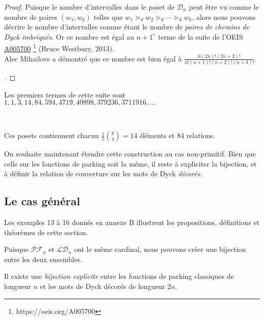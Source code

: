 \begin{proof}
    Puisque le nombre d'intervalles dans le poset de $\mathcal{D}_n$
    peut être vu comme le nombre de paires $(w_1, w_k)$ telles que
    $w_1 \gtrdot_d w_2 \gtrdot_d \cdots \gtrdot_d w_k$, alors nous pouvons
    décrire le nombre d'intervalles comme étant le nombre de 
    \emph{paires de chemins de Dyck imbriqués}.
    Or ce nombre est égal au $n+1^{e}$ terme de la suite de l'OEIS 
    \href{https://oeis.org/A005700}{A005700}
    \footnote{https://oeis.org/A005700} (Bruce Westbury, 2013).\\
Alec Mihailovs a démontré que ce nombre est bien égal à 
$\displaystyle\frac {6 (2n)! (2n+2)!}{n!(n+1)!(n+2)!(n+3)!}$.

.
\end{proof}

Les premiers termes de cette suite sont $1, 1, 3, 14, 84,
594, 4719, 40898, 379236, 3711916, ...$\\

\begin{expl}
    ~\\
    \begin{center}
        
        Ces posets contiennent chacun $\frac {1}{5} \binom{8}{4} =
        14$ éléments et $84$ relations.
    \end{center}
\end{expl}

On souhaite maintenant étendre cette construction au cas non-primitif.
Bien que celle sur les fonctions de parking soit la même, il
reste à expliciter la bijection, et à définir la relation de couverture
sur les mots de Dyck \emph{décorés}.

\subsection{Le cas général}

Les exemples 13 à 16 donnés en annexe B illustrent les propositions,
définitions et théorèmes de cette section.

Puisque $\mathcal{PF}_n$ et $\mathcal{LD}_n$ ont le même cardinal,
nous pouvons créer une bijection entre les deux ensembles.

\begin{prop}
    Il existe une \emph{bijection explicite} entre les fonctions de parking
    classiques de longueur $n$ et les mots de Dyck décorés de
    longueur $2n$.
\end{prop}

